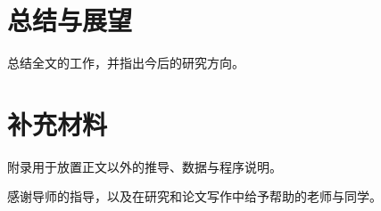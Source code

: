\documentclass[type=doctor]{fduthesis}
\begin{document}
\chapter{总结与展望}
总结全文的工作，并指出今后的研究方向。

\appendix

\chapter{补充材料}
附录用于放置正文以外的推导、数据与程序说明。

\backmatter

\printbibliography

\begin{acknowledgements}
  感谢导师的指导，以及在研究和论文写作中给予帮助的老师与同学。
\end{acknowledgements}
\end{document}

